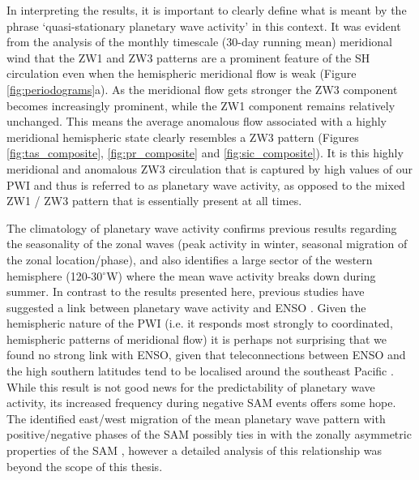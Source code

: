 In interpreting the results, it is important to clearly define what is meant by the phrase `quasi-stationary planetary wave activity' in this context. It was evident from the analysis of the monthly timescale (30-day running mean) meridional wind that the ZW1 and ZW3 patterns are a prominent feature of the SH circulation even when the hemispheric meridional flow is weak (Figure \ref{fig:periodograms}a). As the meridional flow gets stronger the ZW3 component becomes increasingly prominent, while the ZW1 component remains relatively unchanged. This means the average anomalous flow associated with a highly meridional hemispheric state clearly resembles a ZW3 pattern (Figures \ref{fig:tas_composite}, \ref{fig:pr_composite} and \ref{fig:sic_composite}). It is this highly meridional and anomalous ZW3 circulation that is captured by high values of our PWI and thus is referred to as planetary wave activity, as opposed to the mixed ZW1 / ZW3 pattern that is essentially present at all times.  

The climatology of planetary wave activity confirms previous results regarding the seasonality of the zonal waves (peak activity in winter, seasonal migration of the zonal location/phase), and also identifies a large sector of the western hemisphere (120-30$^{\circ}$W) where the mean wave activity breaks down during summer. In contrast to the results presented here, previous studies have suggested a link between planetary wave activity and ENSO \citep[e.g.][]{Trenberth1980,Raphael2003,Hobbs2007}. Given the hemispheric nature of the PWI (i.e. it responds most strongly to coordinated, hemispheric patterns of meridional flow) it is perhaps not surprising that we found no strong link with ENSO, given that teleconnections between ENSO and the high southern latitudes tend to be localised around the southeast Pacific \citep{Simmonds1995,Turner2004}. While this result is not good news for the predictability of planetary wave activity, its increased frequency during negative SAM events offers some hope. The identified east/west migration of the mean planetary wave pattern with positive/negative phases of the SAM possibly ties in with the zonally asymmetric properties of the SAM \citep[e.g.][]{Kidson1988,Kidston2009}, however a detailed analysis of this relationship was beyond the scope of this thesis.

